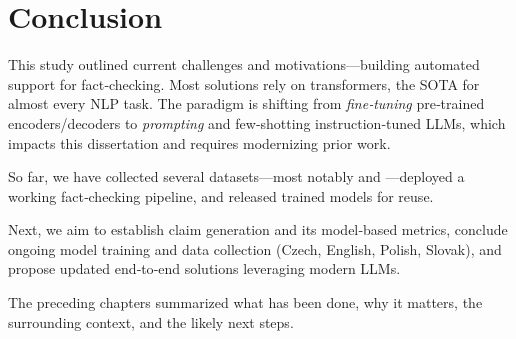 
\chapter{Conclusion}
\label{chap:conclusion}
This study outlined current challenges and motivations—building automated support for fact‑checking.
Most solutions rely on transformers, the SOTA for almost every NLP task.
The paradigm is shifting from \textit{fine‑tuning} pre‑trained encoders/decoders to \textit{prompting} and few‑shotting instruction‑tuned LLMs, which impacts this dissertation and requires modernizing prior work.

So far, we have collected several datasets—most notably \FCZ and \CTK—deployed a working fact‑checking pipeline, and released trained models for reuse.

Next, we aim to establish claim generation and its model‑based metrics, conclude ongoing model training and data collection (Czech, English, Polish, Slovak), and propose updated end‑to‑end solutions leveraging modern LLMs.

The preceding chapters summarized what has been done, why it matters, the surrounding context, and the likely next steps.